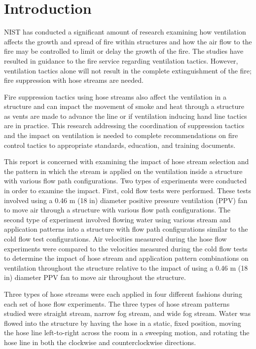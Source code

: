 \documentclass[12pt,oneside]{book}
\begin{document}
\mainmatter

\chapter{Introduction}
\label{chap:Introduction}
NIST has conducted a significant amount of research examining how ventilation affects the growth and spread of fire within structures and how the air flow to the fire may be controlled to limit or delay the growth of the fire. The studies have resulted in guidance to the fire service regarding ventilation tactics. However, ventilation tactics alone will not result in the complete extinguishment of the fire; fire suppression with hose streams are needed.

Fire suppression tactics using hose streams also affect the ventilation in a structure and can impact the movement of smoke and heat through a structure as vents are made to advance the line or if ventilation inducing hand line tactics are in practice. This research addressing the coordination of suppression tactics and the impact on ventilation is needed to complete recommendations on fire control tactics to appropriate standards, education, and training documents.

This report is concerned with examining the impact of hose stream selection and the pattern in which the stream is applied on the ventilation inside a structure with various flow path configurations. Two types of experiments were conducted in order to examine the impact. First, cold flow tests were performed. These tests involved using a 0.46 m (18 in) diameter positive pressure ventilation (PPV) fan to move air through a structure with various flow path configurations. The second type of experiment involved flowing water using various stream and application patterns into a structure with flow path configurations similar to the cold flow test configurations. Air velocities measured during the hose flow experiments were compared to the velocities measured during the cold flow tests to determine the impact of hose stream and application pattern combinations on ventilation throughout the structure relative to the impact of using a 0.46 m (18 in) diameter PPV fan to move air throughout the structure. 

Three types of hose streams were each applied in four different fashions during each set of hose flow experiments. The three types of hose stream patterns studied were straight stream, narrow fog stream, and wide fog stream. Water was flowed into the structure by having the hose in a static, fixed position, moving the hose line left-to-right across the room in a sweeping motion, and rotating the hose line in both the clockwise and counterclockwise directions.
\end{document}
